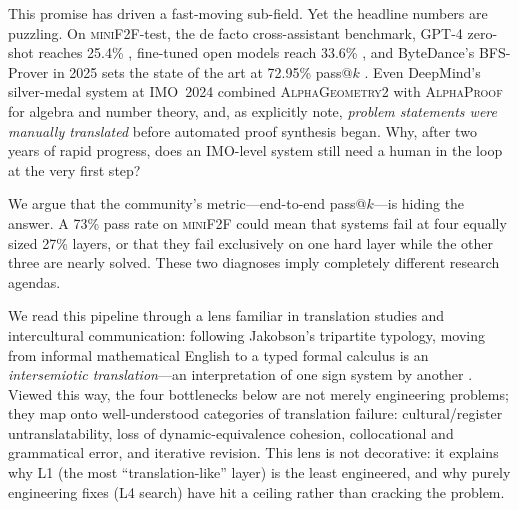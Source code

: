 \documentclass[11pt,letterpaper]{article}
\begin{document}
This promise has driven a fast-moving sub-field. Yet the headline
numbers are puzzling. On \textsc{miniF2F}-test, the de facto
cross-assistant benchmark, GPT-4 zero-shot reaches 25.4\%
\cite{wang2024theoremllama}, fine-tuned open models reach
33.6\% \cite{wang2024theoremllama}, and ByteDance's BFS-Prover in 2025
sets the state of the art at 72.95\% pass@$k$ \cite{xin2025bfsprover}.
Even DeepMind's silver-medal system at IMO~2024 combined
\textsc{AlphaGeometry2} \cite{chervonyi2025alphageometry2} with
\textsc{AlphaProof} for algebra and number theory, and, as
\citet{jana2025proofbridge} explicitly note, \emph{problem statements
were manually translated} before automated proof synthesis began.
Why, after two years of rapid progress, does an IMO-level system still
need a human in the loop at the very first step?

We argue that the community's metric---end-to-end pass@$k$---is hiding
the answer. A 73\% pass rate on \textsc{miniF2F} could mean that
systems fail at four equally sized 27\% layers, or that they fail
exclusively on one hard layer while the other three are nearly solved.
These two diagnoses imply completely different research agendas.

We read this pipeline through a lens familiar in translation studies
and intercultural communication: following Jakobson's tripartite
typology, moving from informal mathematical English to a typed formal
calculus is an \emph{intersemiotic translation}---an interpretation of
one sign system by another \cite{jakobson1959translation}. Viewed this
way, the four bottlenecks below are not merely engineering problems;
they map onto well-understood categories of translation failure:
cultural/register untranslatability, loss of dynamic-equivalence
cohesion, collocational and grammatical error, and iterative revision.
This lens is not decorative: it explains why L1 (the most
``translation-like'' layer) is the least engineered, and why purely
engineering fixes (L4 search) have hit a ceiling rather than cracking
the problem.
\end{document}
